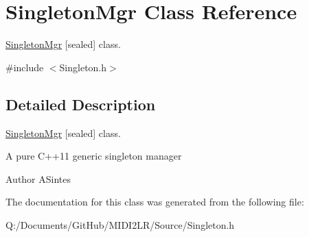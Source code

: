 \hypertarget{class_singleton_mgr}{}\section{Singleton\+Mgr Class Reference}
\label{class_singleton_mgr}


\hyperlink{class_singleton_mgr}{Singleton\+Mgr} \mbox{[}sealed\mbox{]} class.  




{\ttfamily \#include $<$Singleton.\+h$>$}



\subsection{Detailed Description}
\hyperlink{class_singleton_mgr}{Singleton\+Mgr} \mbox{[}sealed\mbox{]} class. 

A pure C++11 generic singleton manager \begin{DoxyAuthor}{Author}
A\+Sintes 
\end{DoxyAuthor}


The documentation for this class was generated from the following file\+:\begin{DoxyCompactItemize}
\item 
Q\+:/\+Documents/\+Git\+Hub/\+M\+I\+D\+I2\+L\+R/\+Source/Singleton.\+h\end{DoxyCompactItemize}

